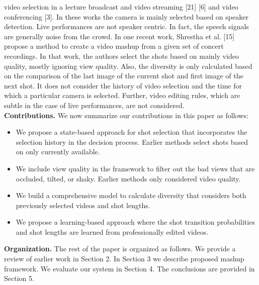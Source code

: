 \documentclass{sig-alternate}
\begin{document}
video selection in a lecture broadcast and video streaming [21] [6]
and video conferencing [3]. In these works the camera is mainly
selected based on speaker detection. Live performances are not
speaker centric. In fact, the speech signals are generally noise from
the crowd. In one recent work, Shrestha et al. [15] propose a
method to create a video mashup from a given set of concert recordings. In that work, the authors select the shots based on mainly
video quality, mostly ignoring view quality. Also, the diversity is
only calculated based on the comparison of the last image of the
current shot and first image of the next shot. It does not consider
the history of video selection and the time for which a particular
camera is selected. Further, video editing rules, which are subtle in
the case of live performances, are not considered.\\
\textbf{Contributions.} We now summarize our contributions in this paper as follows:
\begin{itemize}
\item We propose a state-based approach for shot selection that incorporates the selection history in the decision process. Earlier methods select shots based on only currently available.
\item  We include view quality in the framework to filter out the
bad views that are occluded, tilted, or shaky. Earlier methods
only considered video quality.
\item We build a comprehensive model to calculate diversity that
considers both previously selected videos and shot lengths.
\item We propose a learning-based approach where the shot transition probabilities and shot lengths are learned from professionally edited videos.
\end{itemize}

\textbf{Organization.} The rest of the paper is organized as follows.
We provide a review of earlier work in Section 2. In Section 3 we
describe proposed mashup framework. We evaluate our system in
Section 4. The conclusions are provided in Section 5.
\end{document}
